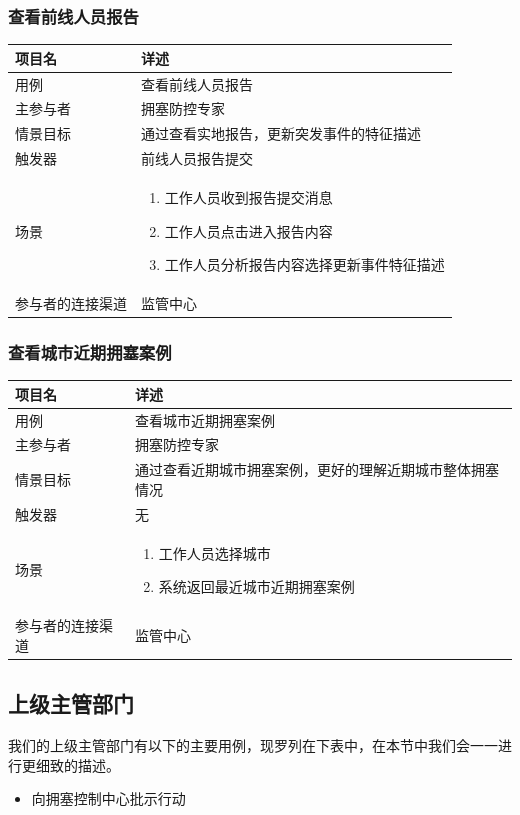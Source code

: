 \documentclass{ctexrep}
\begin{document}
\subsubsection{查看前线人员报告}
\begin{longtable}{p{2cm} | p{10cm}}
\hline
项目名 & 详述 \\
\hline
\hline
用例 & 查看前线人员报告\\
\hline
主参与者 & 拥塞防控专家\\
\hline
情景目标 & 通过查看实地报告，更新突发事件的特征描述 \\
\hline
触发器 & 前线人员报告提交\\
\hline
场景 & \begin{enumerate}
	\item 工作人员收到报告提交消息
	\item 工作人员点击进入报告内容
	\item 工作人员分析报告内容选择更新事件特征描述
\end{enumerate} \\
\hline
参与者的连接渠道 & 监管中心 \\
\hline
\end{longtable}

\subsubsection{查看城市近期拥塞案例}
\begin{longtable}{p{2cm} | p{10cm}}
\hline
项目名 & 详述 \\
\hline
\hline
用例 & 查看城市近期拥塞案例\\
\hline
主参与者 & 拥塞防控专家\\
\hline
情景目标 & 通过查看近期城市拥塞案例，更好的理解近期城市整体拥塞情况 \\
\hline
触发器 & 无\\
\hline
场景 & \begin{enumerate}
	\item 工作人员选择城市
	\item 系统返回最近城市近期拥塞案例
\end{enumerate} \\
\hline
参与者的连接渠道 & 监管中心 \\
\hline
\end{longtable}

\subsection{上级主管部门}
我们的上级主管部门有以下的主要用例，现罗列在下表中，在本节中我们会一一进行更细致的描述。
\begin{itemize}
\item 向拥塞控制中心批示行动
\end{itemize}
\end{document}
